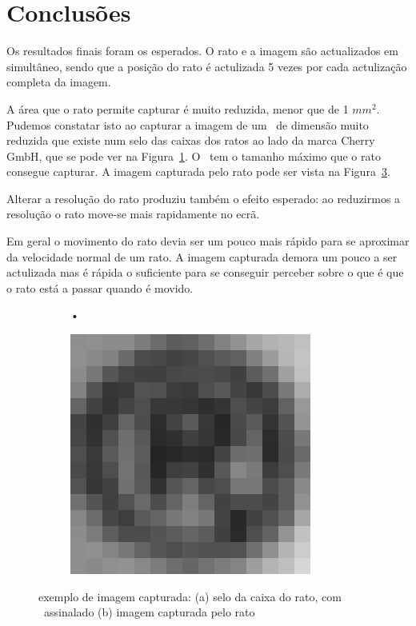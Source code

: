 \documentclass[a4paper]{article}
\begin{document}
\pagebreak
\section{Conclusões}

Os resultados finais foram os esperados. O rato e a imagem são actualizados em simultâneo, sendo que a posição do rato é actulizada 5 vezes por cada actulização completa da imagem.

A área que o rato permite capturar é muito reduzida, menor que de 1 $mm^2$. Pudemos constatar isto ao capturar a imagem de um \textregistered\ de dimensão muito reduzida que existe num selo das caixas dos ratos ao lado da marca Cherry GmbH, que se pode ver na Figura~\ref{fig:Cherry_box}. O \textregistered\ tem o tamanho máximo que o rato consegue capturar. A imagem capturada pelo rato pode ser vista na Figura~\ref{fig:registed_capture}.

Alterar a resolução do rato produziu também o efeito esperado: ao reduzirmos a resolução o rato move-se mais rapidamente no ecrã.

Em geral o movimento do rato devia ser um pouco mais rápido para se aproximar da velocidade normal de um rato. A imagem capturada demora um pouco a ser actulizada mas é rápida o suficiente para se conseguir perceber sobre o que é que o rato está a passar quando é movido.

\begin{figure}[h]
	\centering
	\begin{subfigure}[b]{0.45\textwidth}
		\centering
		•
		\caption{}
		\label{fig:Cherry_box}
	\end{subfigure}%
	\begin{subfigure}[b]{0.45\textwidth}
		\centering
		\includegraphics[width=\linewidth]{rprintscreen}
		\caption{}
		\label{fig:registed_capture}
	\end{subfigure}
	\caption{exemplo de imagem capturada: (a) selo da caixa do rato, com \textregistered\ assinalado (b) imagem capturada pelo rato}
\end{figure}
\end{document}
